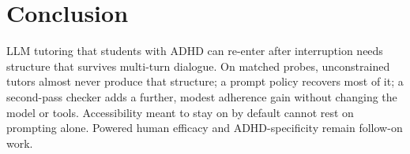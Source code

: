 \section{Conclusion}
\label{sec:conclusion}

LLM tutoring that students with ADHD can re-enter after interruption needs
structure that survives multi-turn dialogue. On matched probes, unconstrained
tutors almost never produce that structure; a prompt policy recovers most of
it; a second-pass checker adds a further, modest adherence gain without
changing the model or tools. Accessibility meant to stay on by default cannot
rest on prompting alone. Powered human efficacy and ADHD-specificity remain
follow-on work.
